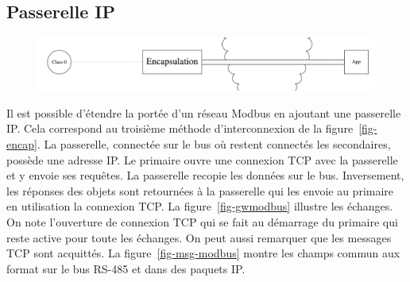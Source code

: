\subsection{Passerelle IP}

\begin{figure}
\centerline{\includegraphics[width=.5\columnwidth]{Pictures/encaps3.png}}
\end{figure}

Il est possible d'étendre la portée d'un réseau Modbus en ajoutant une passerelle IP. Cela correspond au troisième méthode d'interconnexion de la figure~\vref{fig-encap}. La passerelle, connectée sur le bus où restent connectés les secondaires, possède une adresse IP. Le primaire ouvre une connexion TCP avec la passerelle et y envoie ses requêtes. La passerelle recopie les données sur le bus. Inversement, les réponses des objets sont retournées à la passerelle qui les envoie au primaire en utilisation la connexion TCP. La figure~\vref{fig-gwmodbus} illustre les échanges. On note l'ouverture de connexion TCP qui se fait au démarrage du primaire qui reste active pour toute les échanges. On peut aussi remarquer que les messages TCP sont acquittés. La figure~\vref{fig-msg-modbus} montre les champs commun aux format sur le bus RS-485 et dans des paquets IP.


